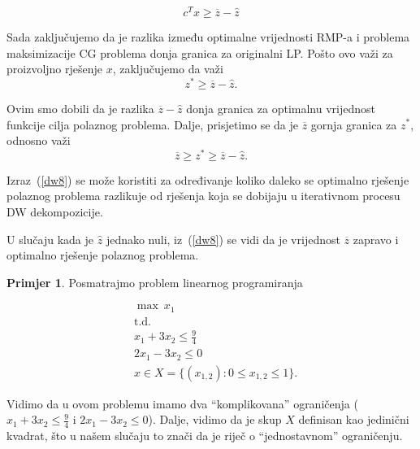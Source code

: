 \documentclass[a4paper, utf8, 11pt, colorlinks]{book}
\theoremstyle{definition}
\newtheorem{primjer}{Primjer}[chapter]
\begin{document}
 $$ c^Tx\geqslant \overline{z}-\hat{z}$$
 
 Sada zaključujemo da je razlika između optimalne vrijednosti RMP-a i problema maksimizacije CG  problema donja granica za originalni LP. Pošto ovo važi za proizvoljno rješenje $x$, zaključujemo da važi 
 $$z^*\geqslant \overline{z}-\hat{z}.$$
 
 Ovim smo dobili da je razlika $\overline{z}-\hat{z}$ donja granica za optimalnu vrijednost funkcije cilja polaznog problema. Dalje, prisjetimo se da je $\overline{z}$ gornja granica za $z^*$, odnosno važi 
\begin{equation}\label{dw8}
	  \overline{z}\geqslant z^*\geqslant \overline{z}-\hat{z}.
\end{equation}
 
 Izraz~(\ref{dw8}) se može koristiti za određivanje koliko daleko se optimalno rješenje polaznog problema razlikuje od rješenja koja se dobijaju u iterativnom procesu DW dekompozicije.
 
 U slučaju kada je $\hat{z}$ jednako nuli, iz~(\ref{dw8}) se vidi da je vrijednost $\overline{z}$ zapravo i optimalno rješenje polaznog problema.
 
\begin{primjer}%
 
 Posmatrajmo problem linearnog programiranja
 \end{primjer}
   \begin{equation}
 	\begin{aligned}\label{primjer:dw1}
 		&\max\  x_1\\
 		&\mbox{t.d.}\\  
 		&x_1+3x_2\leqslant \frac94\\
 		 &2x_1-3x_2\leqslant 0\\
 		&x \in X=\{(x_{1,2}):0\leqslant x_{1, 2}  \leqslant 1\}.
 	\end{aligned}
 \end{equation}
 
 Vidimo da u ovom problemu imamo dva ``komplikovana'' ograničenja ($x_1+3x_2\leqslant \frac94$ i
 $2x_1-3x_2\leqslant 0$). Dalje, vidimo da je skup $X$ definisan kao jedinični kvadrat, što u našem slučaju to znači da je riječ o ``jednostavnom'' ograničenju. 
 
\end{document}
